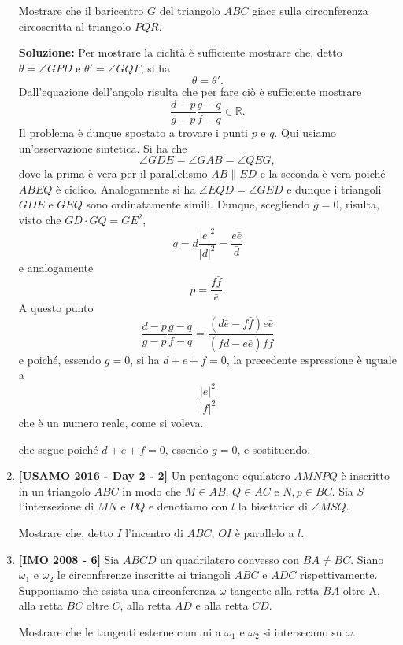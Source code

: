 \begin{enumerate}
	Mostrare che il baricentro $G$ del triangolo $ABC$ giace sulla circonferenza circoscritta al triangolo $PQR$.
	
	\textbf{Soluzione:} Per mostrare la ciclità è sufficiente mostrare che, detto $\theta=\angle GPD$ e $\theta'=\angle GQF$, si ha 
	$$
	\theta=\theta'.
	$$  
	Dall'equazione dell'angolo risulta che per fare ciò è sufficiente mostrare
	$$
	\frac{d-p}{g-p}\frac{g-q}{f-q}\in\mathbb R.
	$$
	Il problema è dunque spostato a trovare i punti $p$ e $q$. Qui usiamo un'osservazione sintetica. Si ha che 
	$$
	\angle GDE=\angle GAB = \angle QEG,
	$$
	dove la prima è vera per il parallelismo $AB\parallel ED$ e la seconda è vera poiché $ABEQ$ è ciclico. 
	Analogamente si ha $\angle EQD=\angle GED$ e dunque i triangoli $GDE$ e $GEQ$ sono ordinatamente simili.
	Dunque, scegliendo $g=0$, risulta, visto che $GD\cdot GQ=GE^2$,
	$$
	q=d\frac{|e|^2}{|d|^2}=\frac{e\bar e}{\bar d}
	$$
	e analogamente 
	$$
	p=\frac{f\bar f}{\bar e}.
	$$
	A questo punto 
	$$
	\frac{d-p}{g-p}\frac{g-q}{f-q}=\frac{(d\bar e-f\bar f)e\bar e}{(f\bar d-e\bar e)f\bar f}
	$$
	e poiché, essendo $g=0$, si ha $d+e+f=0$, la precedente espressione è uguale a 
	$$
	\frac{|e|^2}{|f|^2}
	$$ 
	che è un numero reale, come si voleva.
	
	che segue poiché $d+e+f=0$, essendo $g=0$, e sostituendo. 
	
	
	\item \textbf{[USAMO 2016 - Day 2 - 2]} Un pentagono equilatero $AMNPQ$ è inscritto in un triangolo $ABC$ in modo che $M\in AB$, $Q\in AC$ e $N,p \in BC$. Sia $S$ l'intersezione di $MN$ e $PQ$ e denotiamo con $l$ la bisettrice di $\angle MSQ$. 
	
	Mostrare che, detto $I$ l'incentro di $ABC$, $OI$ è parallelo a $l$.
	\item \textbf{[IMO 2008 - 6]} Sia $ABCD$ un quadrilatero convesso con $BA \neq BC$. Siano $\omega_1$ e $\omega_2$ le circonferenze inscritte ai triangoli $ABC$ e $ADC$ rispettivamente. Supponiamo che esista una circonferenza $\omega$ tangente alla retta $BA$ oltre A, alla retta $BC$ oltre $C$, alla retta $AD$ e alla retta $CD$.
	
	Mostrare che le tangenti esterne comuni a $\omega_1$ e $\omega_2$ si intersecano su $\omega$.
	

\end{enumerate}

